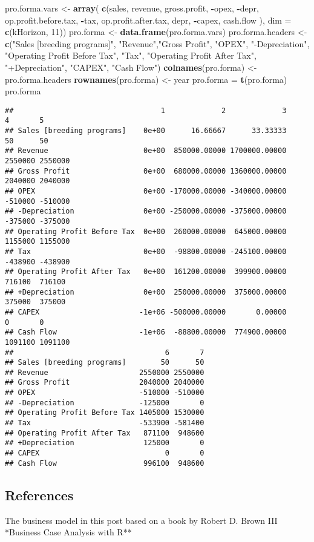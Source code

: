 \documentclass[
]{article}
\newenvironment{Shaded}{\begin{snugshade}}{\end{snugshade}}
\newcommand{\DataTypeTok}[1]{\textcolor[rgb]{0.13,0.29,0.53}{#1}}
\newcommand{\DecValTok}[1]{\textcolor[rgb]{0.00,0.00,0.81}{#1}}
\newcommand{\KeywordTok}[1]{\textcolor[rgb]{0.13,0.29,0.53}{\textbf{#1}}}
\newcommand{\NormalTok}[1]{#1}
\newcommand{\OperatorTok}[1]{\textcolor[rgb]{0.81,0.36,0.00}{\textbf{#1}}}
\newcommand{\StringTok}[1]{\textcolor[rgb]{0.31,0.60,0.02}{#1}}
\begin{document}
\begin{Shaded}
\begin{Highlighting}[]
\NormalTok{pro.forma.vars <-}\StringTok{ }\KeywordTok{array}\NormalTok{( }\KeywordTok{c}\NormalTok{(sales, revenue, gross.profit,}
\OperatorTok{-}\NormalTok{opex, }\OperatorTok{-}\NormalTok{depr, op.profit.before.tax, }\OperatorTok{-}\NormalTok{tax, op.profit.after.tax, depr, }\OperatorTok{-}\NormalTok{capex, cash.flow ), }\DataTypeTok{dim =} \KeywordTok{c}\NormalTok{(kHorizon, }\DecValTok{11}\NormalTok{))}
\NormalTok{pro.forma <-}\StringTok{ }\KeywordTok{data.frame}\NormalTok{(pro.forma.vars)}
\NormalTok{pro.forma.headers <-}\StringTok{ }\KeywordTok{c}\NormalTok{(}\StringTok{"Sales [breeding programs]"}\NormalTok{, }\StringTok{"Revenue"}\NormalTok{,}\StringTok{"Gross Profit"}\NormalTok{,}
\StringTok{"OPEX"}\NormalTok{, }\StringTok{"-Depreciation"}\NormalTok{, }\StringTok{"Operating Profit Before Tax"}\NormalTok{, }\StringTok{"Tax"}\NormalTok{, }\StringTok{"Operating Profit After Tax"}\NormalTok{, }\StringTok{"+Depreciation"}\NormalTok{, }\StringTok{"CAPEX"}\NormalTok{,}
\StringTok{"Cash Flow"}\NormalTok{)}
\KeywordTok{colnames}\NormalTok{(pro.forma) <-}\StringTok{ }\NormalTok{pro.forma.headers}
\KeywordTok{rownames}\NormalTok{(pro.forma) <-}\StringTok{ }\NormalTok{year}
\NormalTok{pro.forma =}\StringTok{ }\KeywordTok{t}\NormalTok{(pro.forma)}
\NormalTok{pro.forma}
\end{Highlighting}
\end{Shaded}

\begin{verbatim}
##                                  1             2             3       4       5
## Sales [breeding programs]    0e+00      16.66667      33.33333      50      50
## Revenue                      0e+00  850000.00000 1700000.00000 2550000 2550000
## Gross Profit                 0e+00  680000.00000 1360000.00000 2040000 2040000
## OPEX                         0e+00 -170000.00000 -340000.00000 -510000 -510000
## -Depreciation                0e+00 -250000.00000 -375000.00000 -375000 -375000
## Operating Profit Before Tax  0e+00  260000.00000  645000.00000 1155000 1155000
## Tax                          0e+00  -98800.00000 -245100.00000 -438900 -438900
## Operating Profit After Tax   0e+00  161200.00000  399900.00000  716100  716100
## +Depreciation                0e+00  250000.00000  375000.00000  375000  375000
## CAPEX                       -1e+06 -500000.00000       0.00000       0       0
## Cash Flow                   -1e+06  -88800.00000  774900.00000 1091100 1091100
##                                   6       7
## Sales [breeding programs]        50      50
## Revenue                     2550000 2550000
## Gross Profit                2040000 2040000
## OPEX                        -510000 -510000
## -Depreciation               -125000       0
## Operating Profit Before Tax 1405000 1530000
## Tax                         -533900 -581400
## Operating Profit After Tax   871100  948600
## +Depreciation                125000       0
## CAPEX                             0       0
## Cash Flow                    996100  948600
\end{verbatim}

\hypertarget{references}{%
\subsection{References}\label{references}}

The business model in this post based on a book by Robert D. Brown III
*Business Case Analysis with R**
\end{document}
